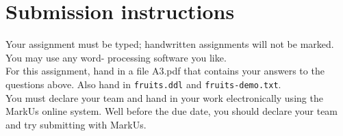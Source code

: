\documentclass[10pt]{article}
\begin{document}
\newpage
\section*{Submission instructions}
Your assignment must be typed; handwritten assignments will not be marked. You may use any word- processing software you like.\\
For this assignment, hand in a file A3.pdf that contains your answers to the questions above. Also hand in \texttt{fruits.ddl} and \texttt{fruits-demo.txt}.\\
You must declare your team and hand in your work electronically using the MarkUs online system. Well before the due date, you should declare your team and try submitting with MarkUs.
\end{document}
